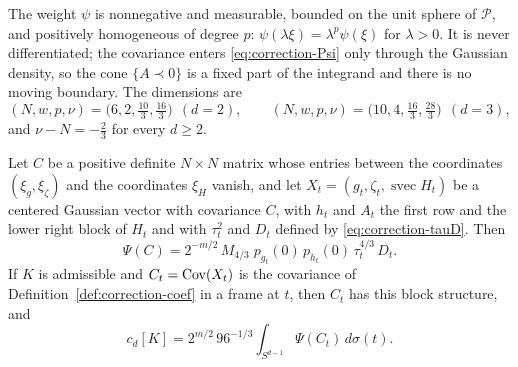 The weight $\psi$ is nonnegative and measurable, bounded on the unit sphere of $\mathcal P$, and positively homogeneous of degree $p$: $\psi(\lambda\xi)=\lambda^p\psi(\xi)$ for $\lambda>0$. It is never differentiated; the covariance enters \eqref{eq:correction-Psi} only through the Gaussian density, so the cone $\{A\prec0\}$ is a fixed part of the integrand and there is no moving boundary. The dimensions are
\begin{equation}\label{eq:correction-dims}
(N,w,p,\nu)=\bigl(6,2,\tfrac{10}3,\tfrac{16}3\bigr)\ \ (d=2),\qquad (N,w,p,\nu)=\bigl(10,4,\tfrac{16}3,\tfrac{28}3\bigr)\ \ (d=3),
\end{equation}
and $\nu-N=-\tfrac23$ for every $d\ge2$.

\begin{lemma}\label{lem:correction-subspace}
Let $C$ be a positive definite $N\times N$ matrix whose entries between the coordinates $(\xi_g,\xi_\zeta)$ and the coordinates $\xi_H$ vanish, and let $X_t=(g_t,\zeta_t,\operatorname{svec}H_t)$ be a centered Gaussian vector with covariance $C$, with $h_t$ and $A_t$ the first row and the lower right block of $H_t$ and with $\tau_t^2$ and $D_t$ defined by \eqref{eq:correction-tauD}. Then
\begin{equation}\label{eq:correction-subspace-rep}
\Psi(C)=2^{-m/2}\,M_{4/3}\;p_{g_t}(0)\,p_{h_t}(0)\,\tau_t^{4/3}\,D_t .
\end{equation}
If $K$ is admissible and $C_t=\operatorname{Cov}(X_t)$ is the covariance of Definition~\ref{def:correction-coef} in a frame at $t$, then $C_t$ has this block structure, and
\begin{equation}\label{eq:correction-coef-Psi}
c_d[K]=2^{m/2}\,96^{-1/3}\int_{S^{d-1}}\Psi(C_t)\,d\sigma(t).
\end{equation}
\end{lemma}

